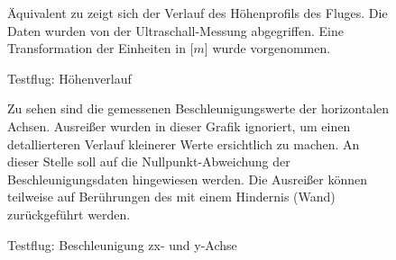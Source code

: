 \begin{figure}[ht!]
\vspace{0.25cm}
\begin{center}
\caption{Testflug: Höhenverlauf}
\label{fig:FlightHeight}
\end{center}

\vspace{0.25cm}
Äquivalent zu  zeigt sich der Verlauf des Höhenprofils des Fluges. Die Daten wurden von der Ultraschall-Messung abgegriffen. Eine Transformation der Einheiten in [$m$] wurde vorgenommen.
\end{figure}


\begin{figure}[ht!]
\vspace{0.25cm}
\begin{center}
\caption{Testflug: Beschleunigung zx- und y-Achse}
\label{fig:Flightaxay}
\end{center}

\vspace{0.25cm}
Zu sehen sind die gemessenen Beschleunigungswerte der horizontalen Achsen. Ausreißer wurden in dieser Grafik ignoriert, um einen detallierteren Verlauf kleinerer Werte ersichtlich zu machen. An dieser Stelle soll auf die Nullpunkt-Abweichung der Beschleunigungsdaten hingewiesen werden.
Die Ausreißer können teilweise auf Berührungen des \Quad[s] mit einem Hindernis (Wand) zurückgeführt werden. 
\end{figure}



